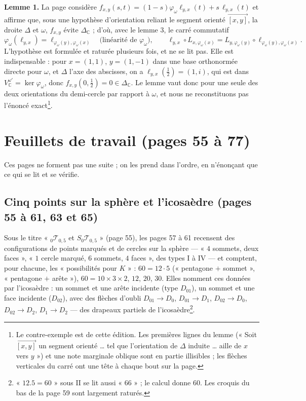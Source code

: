\documentclass[11pt,a4paper]{article}
\begin{document}
\textbf{Lemme 1.} La page considère $f_{x,y}(s,t) = (1-s)\varphi_\omega
\ell_{y,x}(t) + s\,\ell_{y,x}(t)$ et affirme que, sous une hypothèse
d'orientation reliant le segment orienté $\overrightarrow{[x,y]}$, la droite
$\Delta$ et $\omega$, $f_{x,y}$ évite $\Delta_{\mathbb{C}}$ ; d'où, avec le
lemme 3, le carré commutatif
\[
\varphi_\omega(\ell_{y,x}) = \ell_{\varphi_\omega(y), \varphi_\omega(x)}
\quad\text{(linéarité de } \varphi_\omega\text{)}, \qquad
\ell_{y,x} \circ L_{x,\varphi_\omega(x)} = L_{y,\varphi_\omega(y)} \circ
\ell_{\varphi_\omega(y), \varphi_\omega(x)} .
\]
L'hypothèse est formulée et raturée plusieurs fois, et ne se lit pas. Elle est
indispensable : pour $x = (1,1)$, $y = (1,-1)$ dans une base orthonormée
directe pour $\omega$, et $\Delta$ l'axe des abscisses, on a $\ell_{y,x}(\frac12)
= (1, i)$, qui est dans $V_{\mathbb{C}}^{\omega'} = \ker\varphi_\omega$, donc
$f_{x,y}(0, \frac12) = 0 \in \Delta_{\mathbb{C}}$. Le lemme vaut donc pour une
seule des deux orientations du demi-cercle par rapport à $\omega$, et nous ne
reconstituons pas l'énoncé exact\footnote{Le contre-exemple est de cette
édition. Les premières lignes du lemme (« Soit $\overrightarrow{[x,y]}$ un
segment orienté \ldots{} tel que l'orientation de $\Delta$ induite \ldots{}
aille de $x$ vers $y$ ») et une note marginale oblique sont en partie
illisibles ; les flèches verticales du carré ont une tête à chaque bout sur la
page.}.

\section*{Feuillets de travail (pages 55 à 77)}

Ces pages ne forment pas une suite ; on les prend dans l'ordre, en n'énonçant
que ce qui se lit et se vérifie.

\subsection*{Cinq points sur la sphère et l'icosaèdre (pages 55 à 61, 63 et 65)}

Sous le titre « ${}_0\mathcal{T}_{0,5}$ et $S_0\mathcal{T}_{0,5}$ » (page 55),
les pages 57 à 61 recensent des configurations de points marqués et de
cercles sur la sphère — « $4$ sommets, deux faces », « $1$ cercle marqué, $6$
sommets, $4$ faces », des types I à IV — et comptent, pour chacune, les
« possibilités pour $K$ » : $60 = 12 \cdot 5$ (« pentagone $+$ sommet », «
pentagone $+$ arête »), $60 = 10 \times 3 \times 2$, $12$, $20$, $30$. Elles
nomment ces données par l'icosaèdre : un sommet et une arête incidente (type
$D_{01}$), un sommet et une face incidente ($D_{02}$), avec des flèches
d'oubli $D_{01} \to D_0$, $D_{01} \to D_1$, $D_{02} \to D_0$, $D_{02} \to D_2$,
$D_1 \to D_2$ — des drapeaux partiels de l'icosaèdre\footnote{« $12.5 = 60$ »
sous II se lit aussi « $66$ » ; le calcul donne $60$. Les croquis du bas de la
page 59 sont largement raturés.}.
\end{document}
